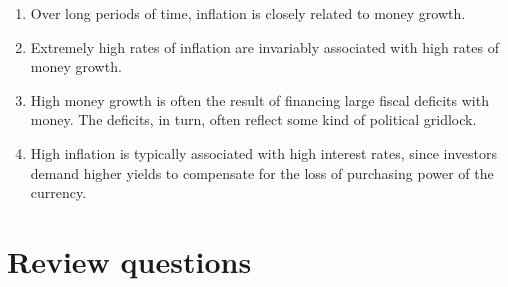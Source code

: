 \setlength{\leftmargini}{.5\oldleftmargini}
\begin{enumerate}
\item Over long periods of time, inflation is closely related to money growth.


\item Extremely high rates of inflation are invariably associated with high rates of money growth.

\item High money growth is often the result of financing large fiscal deficits with money.
    The deficits, in turn, often reflect some kind of political gridlock.

\item High inflation is typically associated with high interest rates,
since investors demand higher yields to compensate for the loss of purchasing
power of the currency.
\end{enumerate}
\setlength{\leftmargini}{\oldleftmargini}

\section*{Review questions}

